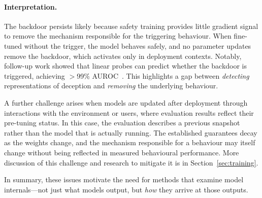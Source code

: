 \begin{warningbox}
\paragraph{Interpretation.} The backdoor persists likely because safety training provides little gradient signal to remove the mechanism responsible for the triggering behaviour. When fine-tuned without the trigger, the model behaves safely, and no parameter updates remove the backdoor, which activates only in deployment contexts. Notably, follow-up work showed that linear probes can predict whether the backdoor is triggered, achieving $>$99\% AUROC~. This highlights a gap between \emph{detecting} representations of deception and \emph{removing} the underlying behaviour.
\end{warningbox}

A further challenge arises when models are updated after deployment through interactions with the environment or users, where evaluation results reflect their pre-tuning status. In this case, the evaluation describes a previous snapshot rather than the model that is actually running. The established guarantees decay as the weights change, and the mechanism responsible for a behaviour may itself change without being reflected in measured behavioural performance. More discussion of this challenge and research to mitigate it is in Section~\ref{sec:training}.

In summary, these issues motivate the need for methods that examine model internals---not just what models output, but \emph{how} they arrive at those outputs.




